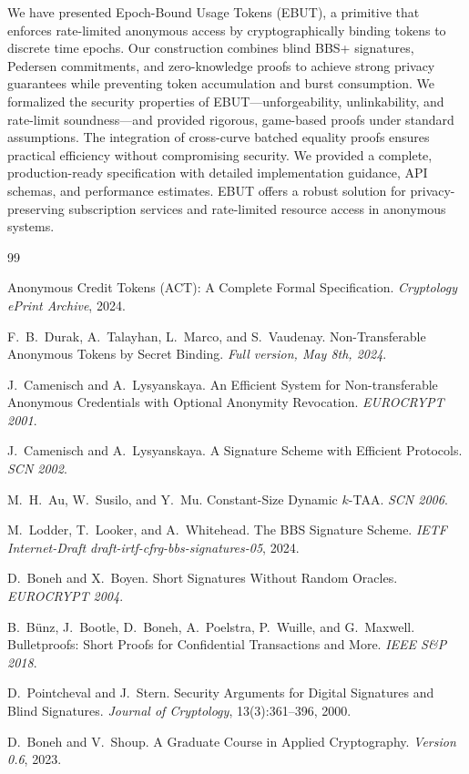 \documentclass[11pt]{article}
\theoremstyle{definitionstyle}
\theoremstyle{plain}
\begin{document}
We have presented Epoch-Bound Usage Tokens (EBUT), a primitive that enforces rate-limited anonymous access by cryptographically binding tokens to discrete time epochs. Our construction combines blind BBS+ signatures, Pedersen commitments, and zero-knowledge proofs to achieve strong privacy guarantees while preventing token accumulation and burst consumption. We formalized the security properties of EBUT—unforgeability, unlinkability, and rate-limit soundness—and provided rigorous, game-based proofs under standard assumptions. The integration of cross-curve batched equality proofs ensures practical efficiency without compromising security. We provided a complete, production-ready specification with detailed implementation guidance, API schemas, and performance estimates. EBUT offers a robust solution for privacy-preserving subscription services and rate-limited resource access in anonymous systems.


\begin{thebibliography}{99}

Anonymous Credit Tokens (ACT): A Complete Formal Specification.
\emph{Cryptology ePrint Archive}, 2024.

F.~B.~Durak, A.~Talayhan, L.~Marco, and S.~Vaudenay.
Non-Transferable Anonymous Tokens by Secret Binding.
\emph{Full version, May 8th, 2024}.

J.~Camenisch and A.~Lysyanskaya.
An Efficient System for Non-transferable Anonymous Credentials with Optional Anonymity Revocation.
\emph{EUROCRYPT 2001}.

J.~Camenisch and A.~Lysyanskaya.
A Signature Scheme with Efficient Protocols.
\emph{SCN 2002}.

M.~H.~Au, W.~Susilo, and Y.~Mu.
Constant-Size Dynamic $k$-TAA.
\emph{SCN 2006}.

M.~Lodder, T.~Looker, and A.~Whitehead.
The BBS Signature Scheme.
\emph{IETF Internet-Draft draft-irtf-cfrg-bbs-signatures-05}, 2024.

D.~Boneh and X.~Boyen.
Short Signatures Without Random Oracles.
\emph{EUROCRYPT 2004}.

B.~B{\"u}nz, J.~Bootle, D.~Boneh, A.~Poelstra, P.~Wuille, and G.~Maxwell.
Bulletproofs: Short Proofs for Confidential Transactions and More.
\emph{IEEE S\&P 2018}.

D.~Pointcheval and J.~Stern.
Security Arguments for Digital Signatures and Blind Signatures.
\emph{Journal of Cryptology}, 13(3):361--396, 2000.

D.~Boneh and V.~Shoup.
A Graduate Course in Applied Cryptography.
\emph{Version 0.6}, 2023.

\end{thebibliography}
\end{document}
